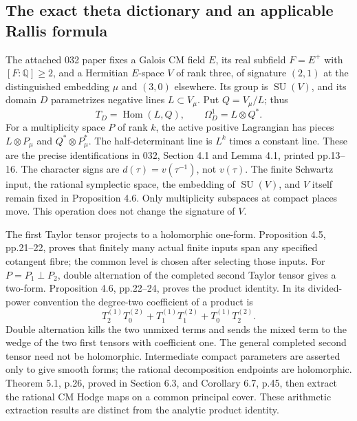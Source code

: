 \documentclass[11pt]{article}
\newcommand{\Q}{\mathbb Q}
\newcommand{\Hom}{\operatorname{Hom}}
\newcommand{\SU}{\operatorname{SU}}
\begin{document}

\subsection{The exact theta dictionary and an applicable Rallis formula}

The attached 032 paper fixes a Galois CM field $E$, its real subfield
$F=E^+$ with $[F:\Q]\geq2$, and a Hermitian $E$-space $V$ of rank three,
of signature $(2,1)$ at the distinguished embedding $\mu$ and $(3,0)$
elsewhere. Its group is $\SU(V)$, and its domain $D$ parametrizes negative
lines $L\subset V_\mu$. Put $Q=V_\mu/L$; thus
\[
 T_D=\Hom(L,Q),\qquad \Omega_D^1=L\otimes Q^*.
\]
For a multiplicity space $P$ of rank $k$, the active positive Lagrangian
has pieces $L\otimes P_\mu$ and $Q^*\otimes P_\mu^*$. The half-determinant
line is $L^k$ times a constant line. These are the precise identifications
in 032, Section 4.1 and Lemma 4.1, printed pp.13--16. The character signs
are $d(\tau)=v(\tau^{-1})$, not $v(\tau)$. The finite Schwartz input, the
rational symplectic space, the embedding of $\SU(V)$, and $V$ itself remain
fixed in Proposition 4.6. Only multiplicity subspaces at compact places
move. This operation does not change the signature of $V$.

The first Taylor tensor projects to a holomorphic one-form. Proposition
4.5, pp.21--22, proves that finitely many actual finite inputs span any
specified cotangent fibre; the common level is chosen after selecting
those inputs. For $P=P_1\perp P_2$, double alternation of the completed
second Taylor tensor gives a two-form. Proposition 4.6, pp.22--24, proves
the product identity. In its divided-power convention the degree-two
coefficient of a product is
\[
 T_2^{(1)}T_0^{(2)}+T_1^{(1)}T_1^{(2)}+T_0^{(1)}T_2^{(2)}.
\]
Double alternation kills the two unmixed terms and sends the mixed term
to the wedge of the two first tensors with coefficient one. The general
completed second tensor need not be holomorphic. Intermediate compact
parameters are asserted only to give smooth forms; the rational
decomposition endpoints are holomorphic. Theorem 5.1, p.26, proved in
Section 6.3, and Corollary 6.7, p.45, then extract the rational CM Hodge
maps on a common principal cover. These arithmetic extraction results
are distinct from the analytic product identity.
\end{document}
